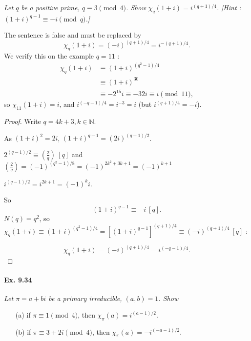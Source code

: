 \documentclass[11pt,a4paper]{article}
\newcommand{\N}{\mathbb{N}}
\newcommand{\legendre}[2]{\genfrac{(}{)}{}{}{#1}{#2}}
\begin{document}
{\it  Let $q$ be a positive prime, $q\equiv 3 \pmod 4$. Show $\chi_q(1+i) = i^{(q+1)/4}$. [Hint : $(1+i)^{q-1} \equiv -i \pmod q$.]
}

\bigskip

The sentence is false and must be replaced by
$$ \chi_q(1+i) = (-i)^{(q+1)/4 } = i^{-(q+1)/4} .$$
We verify this on the example $q=11$ :
\begin{align*}
\chi_{q}(1+i) &\equiv (1+i)^{(q^2-1)/4}\\
& \equiv (1+i)^{30}\\
&\equiv -2^{15} i \equiv -32 i \equiv i \pmod {11},
\end{align*}
so $\chi_{11}(1+i) = i$, and $i^{(-q-1)/4} = i^{-3} = i$ (but $i^{(q+1)/4} = -i$).

\begin{proof}

Write $q = 4k + 3, k \in \N$.

As $(1+i)^2 = 2i$, $(1+i)^{q-1} =  (2i)^{(q-1)/2}$.

$2^{(q-1)/2} \equiv \legendre{2}{q} \ [q]$ and $ \legendre{2}{q} = (-1)^{(q^2-1)/8} = (-1)^{2k^2+3k+1} = (-1)^{k+1}$

$i^{(q-1)/2} = i^{2k+1} = (-1)^k i$. 

So
$$ (1+i)^{q-1} \equiv -i\ [q].$$
$N(q) = q^2$, so $\chi_q(1+i) \equiv (1+i)^{(q^2-1)/4} = [(1+i)^{q-1}]^{(q+1)/4}\equiv (-i)^{(q+1)/4} \ [q]$ :

$$\chi_q(1+i) =(-i)^{(q+1)/4} = i^{(-q-1)/4}.$$
\end{proof}

\paragraph{Ex. 9.34}

{\it Let $\pi = a +bi$ be a primary irreducible, $(a,b) = 1$. Show
\begin{enumerate}
\item[(a)] if $\pi \equiv 1 \pmod 4$, then $\chi_\pi(a) = i^{(a-1)/2}$.
\item[(b)] if $\pi \equiv 3 + 2i\pmod 4$, then $\chi_\pi(a) = -i^{(-a-1)/2}$.
\end{enumerate}
}
\end{document}
